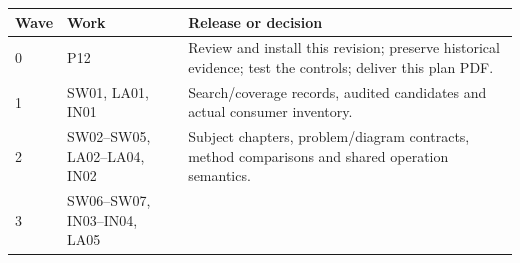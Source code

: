 \documentclass[
  11pt,
  a4paper,
]{article}
\begin{document}
\begin{longtable}[]{@{}lll@{}}
\toprule
\begin{minipage}[b]{0.30\columnwidth}\raggedright
Wave\strut
\end{minipage} & \begin{minipage}[b]{0.30\columnwidth}\raggedright
Work\strut
\end{minipage} & \begin{minipage}[b]{0.30\columnwidth}\raggedright
Release or decision\strut
\end{minipage}\tabularnewline
\midrule
\endhead
\begin{minipage}[t]{0.30\columnwidth}\raggedright
0\strut
\end{minipage} & \begin{minipage}[t]{0.30\columnwidth}\raggedright
P12\strut
\end{minipage} & \begin{minipage}[t]{0.30\columnwidth}\raggedright
Review and install this revision; preserve historical evidence; test the
controls; deliver this plan PDF.\strut
\end{minipage}\tabularnewline
\begin{minipage}[t]{0.30\columnwidth}\raggedright
1\strut
\end{minipage} & \begin{minipage}[t]{0.30\columnwidth}\raggedright
SW01, LA01, IN01\strut
\end{minipage} & \begin{minipage}[t]{0.30\columnwidth}\raggedright
Search/coverage records, audited candidates and actual consumer
inventory.\strut
\end{minipage}\tabularnewline
\begin{minipage}[t]{0.30\columnwidth}\raggedright
2\strut
\end{minipage} & \begin{minipage}[t]{0.30\columnwidth}\raggedright
SW02--SW05, LA02--LA04, IN02\strut
\end{minipage} & \begin{minipage}[t]{0.30\columnwidth}\raggedright
Subject chapters, problem/diagram contracts, method comparisons and
shared operation semantics.\strut
\end{minipage}\tabularnewline
\begin{minipage}[t]{0.30\columnwidth}\raggedright
3\strut
\end{minipage} & \begin{minipage}[t]{0.30\columnwidth}\raggedright
SW06--SW07, IN03--IN04, LA05\strut

\end{minipage}
\end{longtable}
\end{document}
